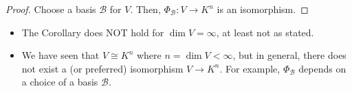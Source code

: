 \begin{proof}
Choose a basis $\mathcal{B}$ for $V$. Then, $\Phi_{\mathcal{B}}: V \to K^n$ is an isomorphism.
\end{proof}

\begin{remark}
\begin{itemize}
    \item The Corollary does NOT hold for $\dim V = \infty$, at least not as stated.
    \item We have seen that $V \cong K^n$ where $n = \dim V < \infty$, but in general, there does not exist a  (or preferred) isomorphism $V \to K^n$. For example, $\Phi_{\mathcal{B}}$ depends on a choice of a basis $\mathcal{B}$.
\end{itemize}
\end{remark}

